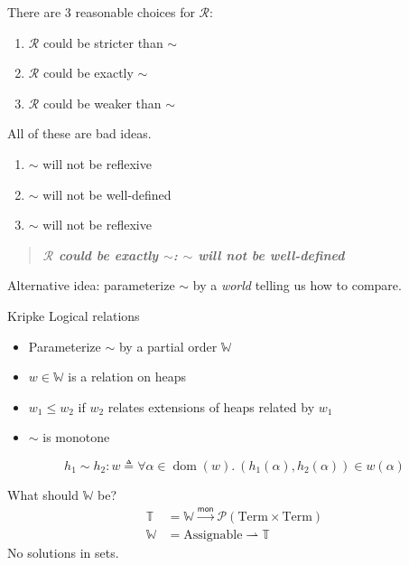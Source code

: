 \documentclass{beamer}
\newcommand{\mto}{\ensuremath{\xrightarrow{\mathsf{mon}}}}
\newcommand{\pto}{\ensuremath{\rightharpoonup}}
\newcommand{\pow}[1]{\ensuremath{\mathcal{P}(#1)}}
\newcommand{\relR}{\ensuremath{\mathrel{\mathcal{R}}}}
\newcommand{\defs}{\ensuremath{\mathrel{\triangleq}}}
\DeclareMathOperator{\dom}{dom}
\newcommand{\worlds}{\ensuremath{\mathbb{W}}}
\newcommand{\assignables}{\ensuremath{\mathrm{Assignable}}}
\newcommand{\semtypes}{\ensuremath{\mathbb{T}}}
\newcommand{\term}{\ensuremath{\mathrm{Term}}}
\begin{document}
\begin{frame}
  \centering
  There are 3 reasonable choices for $\relR$:
  \begin{enumerate}
  \item $\relR$ could be stricter than $\sim$
  \item $\relR$ could be exactly $\sim$
  \item $\relR$ could be weaker than $\sim$
  \end{enumerate}
  \pause
  \bigskip

  All of these are bad ideas.
  \pause
  \bigskip
  \begin{enumerate}
  \item $\sim$ will not be reflexive
  \item $\sim$ will not be well-defined
  \item $\sim$ will not be reflexive
  \end{enumerate}
\end{frame}

\begin{frame}
  \centering
  \begin{quote}
    \bf\it $\relR$ could be exactly $\sim$: $\sim$ will not be well-defined
  \end{quote}
  Alternative idea: parameterize $\sim$ by a \emph{world} telling us
  how to compare.
\end{frame}

\begin{frame}
  \centering
  Kripke Logical relations
  \begin{itemize}
  \item Parameterize $\sim$ by a partial order $\worlds$
  \item $w \in \worlds$ is a relation on heaps
  \item $w_1 \le w_2$ if $w_2$ relates extensions of heaps related by
    $w_1$
  \item $\sim$ is monotone
  \end{itemize}
  \bigskip
  \[
    h_1 \sim h_2 : w \defs \forall \alpha \in \dom(w).\ (h_1(\alpha), h_2(\alpha)) \in w(\alpha)
  \]
\end{frame}

\begin{frame}
  \centering What should $\worlds$ be?
  \begin{align*}
    \semtypes &= \worlds \mto \pow{\term \times \term}\\
    \worlds &= \assignables \pto \semtypes
  \end{align*}
  \pause
  \bigskip
  No solutions in sets.
\end{frame}
\end{document}
